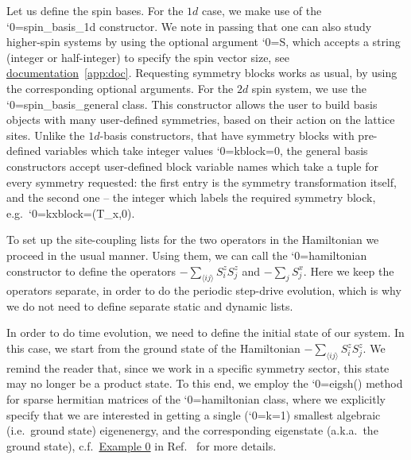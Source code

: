 \documentclass{SciPost}
\newcommand\0{\scalebox{-1}[1]{0}}
\let\svttfamily\ttfamily
\renewcommand\ttfamily{\svttfamily\catcode`0=\active }
\renewcommand\texttt{\bgroup\ttfamily\texttthelp}
\def\texttthelp#1{#1\egroup}
\newcommand{\Spincode}{example9.py}
\begin{document}

Let us define the spin bases. For the $1d$ case, we make use of the \texttt{spin\_basis\_1d} constructor. We note in passing that one can also study higher-spin systems by using the optional argument \texttt{S}, which accepts a string (integer or half-integer) to specify the spin vector size, see \href{http://weinbe58.github.io/QuSpin/index.html}{documentation}~\ref{app:doc}. Requesting symmetry blocks works as usual, by using the corresponding optional arguments. For the $2d$ spin system, we use the \texttt{spin\_basis\_general} class. This constructor allows the user to build basis objects with many user-defined symmetries, based on their action on the lattice sites. Unlike the $1d$-basis constructors, that have symmetry blocks with pre-defined variables which take integer values \texttt{kblock=0}, the general basis constructors accept user-defined block variable names which take a tuple for every symmetry requested: the first entry is the symmetry transformation itself, and the second one -- the integer which labels the required symmetry block, e.g.~\texttt{kxblock=(T\_x,0)}.
 
To set up the site-coupling lists for the two operators in the Hamiltonian we proceed in the usual manner. Using them, we can call the \texttt{hamiltonian} constructor to define the operators $-\sum_{\langle ij\rangle} S^z_{i}S^z_{j}$ and $-\sum_j S^x_j$. Here we keep the operators separate, in order to do the periodic step-drive evolution, which is why we do not need to define separate static and dynamic lists.

In order to do time evolution, we need to define the initial state of our system. In this case, we start from the ground state of the Hamiltonian $-\sum_{\langle ij\rangle} S^z_{i}S^z_{j}$. We remind the reader that, since we work in a specific symmetry sector, this state may no longer be a product state. To this end, we employ the \texttt{eigsh()} method for sparse hermitian matrices of the \texttt{hamiltonian} class, where we explicitly specify that we are interested in getting a single (\texttt{k=1}) smallest algebraic (i.e.~ground state) eigenenergy, and the corresponding eigenstate (a.k.a.~the ground state), c.f.~\href{http://weinbe58.github.io/QuSpin/examples/example0.html}{Example 0} in Ref.~\cite{weinberg_17_quspin} for more details. 

\end{document}
